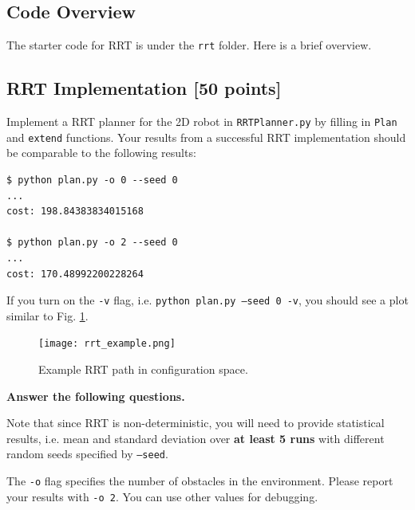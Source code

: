 \documentclass[tp]{lcc}
\begin{document}
\subsection{Code Overview}
The starter code for RRT is under the \texttt{rrt} folder. Here is a brief overview.

\subsection{RRT Implementation [50 points]}
Implement a RRT planner for the 2D robot in \texttt{RRTPlanner.py} by filling in \texttt{Plan} and \texttt{extend} functions. Your results from a successful RRT implementation should be comparable to the following results:

\begin{verbatim}
$ python plan.py -o 0 --seed 0
...
cost: 198.84383834015168

$ python plan.py -o 2 --seed 0
...
cost: 170.48992200228264
\end{verbatim}

If you turn on the \texttt{-v} flag, i.e. \texttt{python plan.py --seed 0 -v}, you should see a plot similar to Fig. \ref{fig:rrt}.

\begin{figure}[h]
    \centering
    \texttt{[image: rrt\_example.png]}
    \caption{Example RRT path in configuration space.}
    \label{fig:rrt}
\end{figure}

\textbf{Answer the following questions.}

Note that since RRT is non-deterministic, you will need to provide statistical results, i.e. mean and standard deviation over \textbf{at least 5 runs} with different random seeds specified by \texttt{--seed}.

The \texttt{-o} flag specifies the number of obstacles in the environment. Please report your results with \texttt{-o 2}. You can use other values for debugging.
\end{document}
